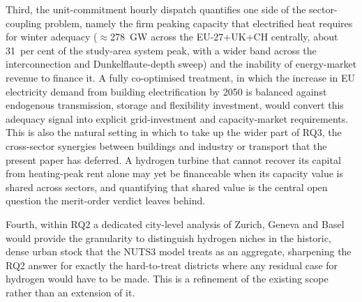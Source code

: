 Third, the unit-commitment hourly dispatch quantifies one side of the
sector-coupling problem, namely the firm peaking capacity that electrified heat
requires for winter adequacy ($\approx$278~GW across the EU-27+UK+CH centrally,
about 31~per cent of the study-area system peak, with a wider band across the
interconnection and Dunkelflaute-depth sweep) and the
inability of energy-market revenue to finance it. A fully co-optimised treatment,
in which the increase in EU electricity demand from building electrification by
2050 is balanced against endogenous transmission, storage and flexibility
investment, would convert this adequacy signal into explicit grid-investment and
capacity-market requirements. This is also the natural setting in which to take up
the wider part of RQ3, the cross-sector synergies between buildings and industry
or transport that the present paper has deferred. A hydrogen turbine that cannot recover its capital
from heating-peak rent alone may yet be financeable when its capacity value is
shared across sectors, and quantifying that shared value is the central open
question the merit-order verdict leaves behind.

Fourth, within RQ2 a dedicated city-level analysis of Zurich, Geneva and Basel
would provide the granularity to distinguish hydrogen niches in the historic, dense
urban stock that the NUTS3 model treats as an aggregate, sharpening the RQ2 answer
for exactly the hard-to-treat districts where any residual case for hydrogen would
have to be made. This is a refinement of the existing scope rather than an extension of it.
